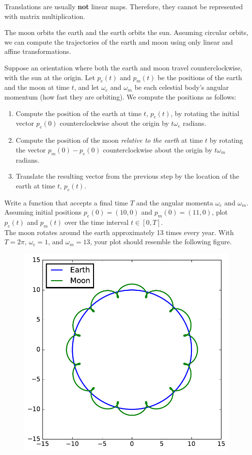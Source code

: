 Translations are usually \textbf{not} linear maps.
Therefore, they cannot be represented with matrix multiplication.

\begin{problem}
The moon orbits the earth and the earth orbits the sun.
Assuming circular orbits, we can compute the trajectories of the earth and moon using only linear and affine transformations.

Suppose an orientation where both the earth and moon travel counterclockwise, with the sun at the origin.
Let $p_e(t)$ and $p_m(t)$ be the positions of the earth and the moon at time $t$, and let $\omega_e$ and $\omega_m$ be each celestial body's angular momentum (how fast they are orbiting).
We compute the positions as follows:

\begin{enumerate}
\item Compute the position of the earth at time $t$, $p_e(t)$, by rotating the initial vector $p_e(0)$ counterclockwise about the origin by $t\omega_e$ radians.
\item Compute the position of the moon \emph{relative to the earth} at time $t$ by rotating the vector $p_m(0) - p_e(0)$ counterclockwise about the origin by $t\omega_m$ radians.
\item Translate the resulting vector from the previous step by the location of the earth at time $t$, $p_e(t)$.
\end{enumerate}

Write a function that accepts a final time $T$ and the angular momenta $\omega_e$ and $\omega_m$.
Assuming initial positions $p_e(0) = (10,0)$ and $p_m(0) = (11,0)$, plot $p_e(t)$ and $p_m(t)$ over the time interval $t \in [0, T]$.
\\

The moon rotates around the earth approximately 13 times every year.
With $T = 2\pi$, $\omega_e = 1$, and $\omega_m = 13$, your plot should resemble the following figure.
%
\begin{figure}[H]
    \includegraphics[width=.7\textwidth]{SolarSystem.pdf}
\end{figure}


\end{problem}

